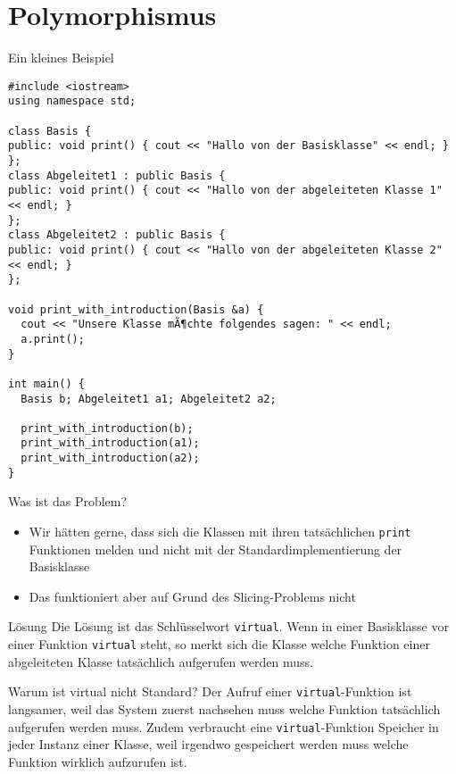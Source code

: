 \documentclass[presentation]{beamer}
\begin{document}
\section{Polymorphismus}
\label{sec:org0b48c44}
\begin{frame}[label={sec:orga4e1776},fragile]{Ein kleines Beispiel}
 \begin{verbatim}
#include <iostream>
using namespace std;

class Basis {
public: void print() { cout << "Hallo von der Basisklasse" << endl; }
};
class Abgeleitet1 : public Basis {
public: void print() { cout << "Hallo von der abgeleiteten Klasse 1" << endl; }
};
class Abgeleitet2 : public Basis {
public: void print() { cout << "Hallo von der abgeleiteten Klasse 2" << endl; }
};

void print_with_introduction(Basis &a) {
  cout << "Unsere Klasse mÃ¶chte folgendes sagen: " << endl;
  a.print();
}

int main() {
  Basis b; Abgeleitet1 a1; Abgeleitet2 a2;

  print_with_introduction(b);
  print_with_introduction(a1);
  print_with_introduction(a2);
}
\end{verbatim}
\end{frame}
\begin{frame}[label={sec:orgc6baf5d},fragile]{Was ist das Problem?}
 \begin{itemize}
\item Wir hätten gerne, dass sich die Klassen mit ihren tatsächlichen
{\color{solarizedYellow}\verb!print!} Funktionen melden und nicht mit der Standardimplementierung
der Basisklasse
\item Das funktioniert aber auf Grund des Slicing-Problems nicht
\end{itemize}
\begin{block}{Lösung}
Die Lösung ist das Schlüsselwort {\color{solarizedYellow}\verb!virtual!}. Wenn in einer Basisklasse
vor einer Funktion {\color{solarizedYellow}\verb!virtual!} steht, so merkt sich die Klasse welche
Funktion einer abgeleiteten Klasse tatsächlich aufgerufen werden muss.
\end{block}
\begin{block}{Warum ist virtual nicht Standard?}
Der Aufruf einer {\color{solarizedYellow}\verb!virtual!}-Funktion ist langsamer, weil das System
zuerst nachsehen muss welche Funktion tatsächlich aufgerufen werden
muss. Zudem verbraucht eine {\color{solarizedYellow}\verb!virtual!}-Funktion Speicher in jeder
Instanz einer Klasse, weil irgendwo gespeichert werden muss welche
Funktion wirklich aufzurufen ist.
\end{block}
\end{frame}
\end{document}
